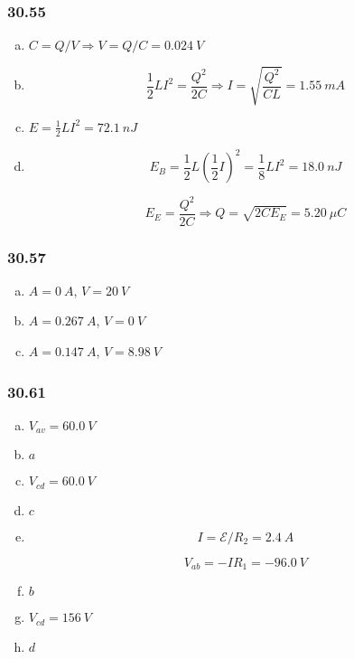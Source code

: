 \documentclass{article}
\begin{document}
\subsubsection{30.55}

\begin{enumerate}[(a)]
  \item $C = Q / V \Rightarrow V = Q / C = \qty{0.024}{V}$

  \item \[\frac{1}{2} L I^2 = \frac{Q^2}{2 C} \Rightarrow I = \sqrt{\frac{Q^2}{C L}} = \qty{1.55}{mA}\]

  \item $E = \frac{1}{2} L I^2 = \qty{72.1}{nJ}$

  \item

        \[E_B = \frac{1}{2} L (\frac{1}{2} I)^2 = \frac{1}{8} L I^2 = \qty{18.0}{nJ}\]

        \[E_E = \frac{Q^2}{2 C} \Rightarrow Q = \sqrt{2 C E_E} = \qty{5.20}{\mu C}\]
\end{enumerate}

\subsubsection{30.57}

\begin{enumerate}[(a)]
  \item $A = \qty{0}{A}$, $V = \qty{20}{V}$

  \item $A = \qty{0.267}{A}$, $V = \qty{0}{V}$

  \item $A = \qty{0.147}{A}$, $V = \qty{8.98}{V}$
\end{enumerate}

\subsubsection{30.61}

\begin{enumerate}[(a)]
  \item $V_{av} = \qty{60.0}{V}$

  \item $a$

  \item $V_{cd} = \qty{60.0}{V}$

  \item $c$

  \item

        \[I = \mathcal{E} / R_2 = \qty{2.4}{A}\]

        \[V_{ab} = -I R_1 = \qty{-96.0}{V}\]

  \item $b$

  \item $V_{cd} = \qty{156}{V}$

  \item $d$
\end{enumerate}
\end{document}
